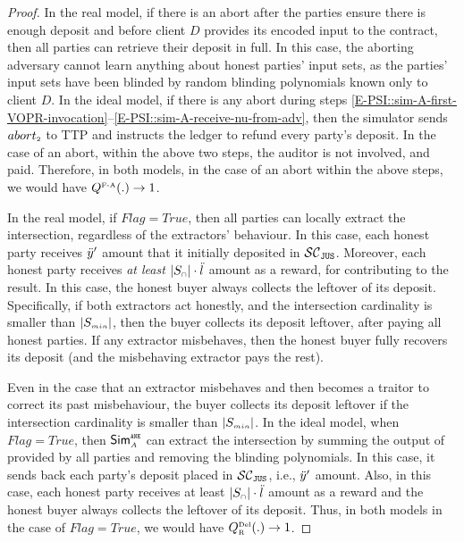 \begin{proof}
In the real model, if there is an abort after the parties ensure there is enough deposit and before client $D$ provides its encoded input to the contract, then all parties can retrieve their deposit in full. In this case, the aborting adversary cannot learn anything about honest parties' input sets, as the parties' input sets have been blinded by random blinding polynomials known only to client $D$. In the ideal model, if there is any abort during steps \ref{E-PSI::sim-A-first-VOPR-invocation}--\ref{E-PSI::sim-A-receive-nu-from-adv}, then the simulator sends $abort_{\scriptscriptstyle 2}$ to TTP and instructs the ledger to refund every party's deposit. In the case of an abort, within the above two steps, the auditor is not involved, and paid. Therefore, in both models,  in the case of an abort within the above steps, we would have $Q^{\scriptscriptstyle \text{F-A}}(.)\rightarrow1$. 




In the real model, if $Flag=True$, then all parties can locally extract the intersection, regardless of the extractors' behaviour. In this case, each honest party receives $\ddot{y}'$ amount that it initially deposited in $\mathcal{SC}_{\mathtt{JUS}}$. Moreover, each honest party receives \emph{at least} $|S_{\scriptscriptstyle\cap}|\cdot \ddot{l}$ amount as a reward, for contributing to the result. In this case, the honest buyer always collects the leftover of its deposit. Specifically, if both extractors act honestly, and the intersection cardinality is smaller than $|S_{\scriptscriptstyle min}|$, then the buyer collects its deposit leftover, after paying all honest parties. If any extractor misbehaves, then the honest buyer fully recovers its deposit (and the misbehaving extractor pays the rest). 

Even in the case that an extractor misbehaves and then becomes a traitor to correct its past misbehaviour, the buyer collects its deposit leftover if the intersection cardinality is smaller than $|S_{\scriptscriptstyle min}|$.  In the ideal model, when $Flag=True$, then $\mathsf{Sim}^{\scriptscriptstyle \mathtt{ANE}}_{\scriptscriptstyle A}$ can extract the intersection by summing the output of \vopr provided by all parties and removing the blinding polynomials. In this case, it sends back each party's deposit placed in $\mathcal{SC}_{\mathtt{JUS}}$, i.e., $\ddot{y}'$ amount. Also, in this case, each honest party receives at least $|S_{\scriptscriptstyle\cap}|\cdot \ddot{l}$ amount as a reward and the honest buyer always collects the leftover of its deposit. Thus, in both models in the case of $Flag=True$, we would have $Q^{\scriptscriptstyle \text{Del}}_{\scriptscriptstyle\text{R}}(.)\rightarrow 1$. 





\end{proof}
